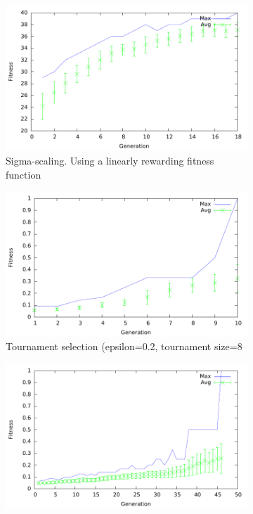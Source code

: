 \begin{figure}[H]
        \centering
        \begin{subfigure}[b]{0.5\textwidth}
                \includegraphics[width=\textwidth]{../results/other-functions/sigma-80-1.pdf}
                \caption{Sigma-scaling. Using a linearly rewarding fitness function}
                \label{fig:sigma}
        \end{subfigure}%
        \begin{subfigure}[b]{0.5\textwidth}
                \includegraphics[width=\textwidth]{../results/other-functions/tournament-8-02.pdf}
                \caption{Tournament selection (epsilon=0.2, tournament size=8}
                \label{fig:tournament}
        \end{subfigure}
        \begin{subfigure}[b]{0.5\textwidth}
                \includegraphics[width=\textwidth]{../results/omx-fgr-fp/omx-80-1-001.pdf}

\end{subfigure}
\end{figure}
